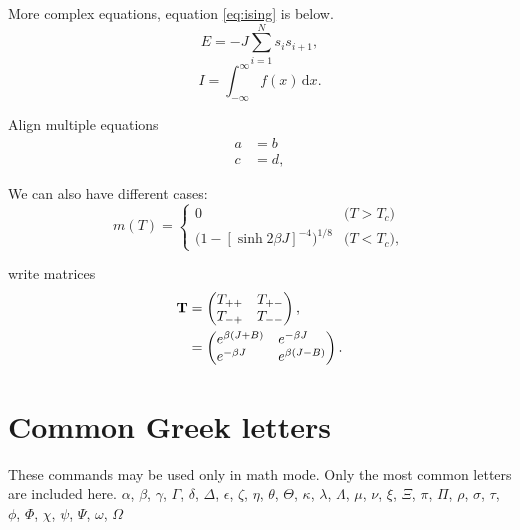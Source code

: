 \documentclass[
    10pt,aps,prl,
    amsfonts,
    amssymb,
    amsmath,
    runinaddress,
    secnum,
    showkeys,
    superscriptaddress,
    twocolumn,
]{revtex4}
\begin{document}
More complex equations, equation \ref{eq:ising} is below.
\begin{equation}
    \label{eq:ising}
    E = -J \sum_{i=1}^N s_i s_{i+1},
\end{equation}
\begin{equation}
    I = \! \int_{-\infty}^\infty f(x)\,\mathrm{d}x \label{eq:fine}.
\end{equation}

Align multiple equations
\begin{align}
    a & = b \\
    c &= d,
\end{align}

We can also have different cases:
\begin{equation}
\label{eq:mdiv}
m(T) =
\begin{cases}
0 & \text{($T > T_c$)} \\
\big(1 - [\sinh 2 \beta J]^{-4} \big)^{\! 1/8} & \text{($T < T_c$)},
\end{cases}
\end{equation}

write matrices
\begin{align}
\textbf{T} &=
\begin{pmatrix}
T_{++} \hfill & T_{+-} \\
T_{-+} & T_{--} \hfill 
\end{pmatrix}, \nonumber \\
& =
\begin{pmatrix}
e^{\beta (J + B)} \hfill & e^{-\beta J} \hfill \\
e^{-\beta J} \hfill & e^{\beta (J - B)} \hfill
\end{pmatrix}.
\end{align}

\section{Common Greek letters}

These commands may be used only in math mode. 
Only the most common letters are included here.
$\alpha$, $\beta$, $\gamma$, $\Gamma$, $\delta$, $\Delta$, $\epsilon$, $\zeta$, $\eta$, $\theta$, $\Theta$, $\kappa$, $\lambda$, $\Lambda$, $\mu$, $\nu$, $\xi$, $\Xi$, $\pi$, $\Pi$, $\rho$, $\sigma$, $\tau$, $\phi$, $\Phi$, $\chi$, $\psi$, $\Psi$, $\omega$, $\Omega$
\end{document}
